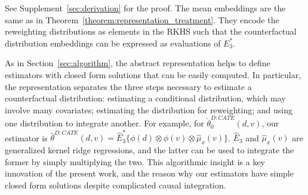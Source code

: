 See Supplement~\ref{sec:derivation} for the proof. The mean embeddings are the same as in Theorem~\ref{theorem:representation_treatment}. They encode the reweighting distributions as elements in the RKHS such that the counterfactual distribution embeddings can be expressed as evaluations of $E_3^*$. 

As in Section~\ref{sec:algorithm}, the abstract representation helps to define estimators with closed form solutions that can be easily computed. In particular, the representation separates the three steps necessary to estimate a counterfactual distribution: estimating a conditional distribution, which may involve many covariates; estimating the distribution for reweighting; and using one distribution to integrate another. For example, for $\check{\theta}_0^{D:CATE}(d,v)$, our estimator is $\hat{\theta}^{D:CATE}(d,v)=\hat{E}_3^*\{\phi(d)\otimes \phi(v) \otimes \hat{\mu}_x(v)\}$. $\hat{E}_3$ and $\hat{\mu}_x(v)$ are generalized kernel ridge regressions, and the latter can be used to integrate the former by simply multiplying the two. This algorithmic insight is a key innovation of the present work, and the reason why our estimators have simple closed form solutions despite complicated causal integration.

